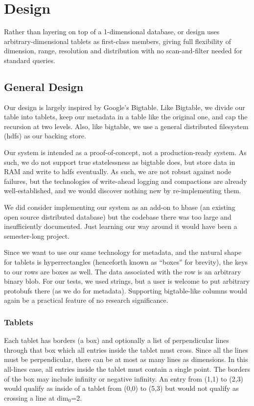 \documentclass[11pt]{article}
\begin{document}
\section{Design}

Rather than layering on top of a 1-dimensional database, or design uses arbitrary-dimensional tablets as first-class members, giving full flexibility of dimension, range, resolution and distribution with no scan-and-filter needed for standard queries.\

\subsection{General Design}

Our design is largely inspired by Google's Bigtable. Like Bigtable, we divide our table into tablets, keep our metadata in a table like the original one, and cap the recursion at two levels. Also, like bigtable, we use a general distributed filesystem (hdfs) as our backing store.

Our system is intended as a proof-of-concept, not a production-ready system. As such, we do not support true statelessness as bigtable does, but store data in RAM and write to hdfs eventually. As such, we are not robust against node failures, but the technologies of write-ahead logging and compactions are already well-established, and we would discover nothing new by re-implementing them.

We did consider implementing our system as an add-on to hbase (an existing open source distributed database) but the codebase there was too large and insufficiently documented. Just learning our way around it would have been a semester-long project.

Since we want to use our same technology for metadata, and the natural shape for tablets is hyperrectangles (henceforth known as ``boxes'' for brevity), the keys to our rows are boxes as well. The data associated with the row is an arbitrary binary blob. For our tests, we used strings, but a user is welcome to put arbitrary protobufs there (as we do for metadata). Supporting bigtable-like columns would again be a practical feature of no research significance.

\subsubsection{Tablets}

Each tablet has borders (a box) and optionally a list of perpendicular lines through that box which all entries inside the tablet must cross. Since all the lines must be perpendicular, there can be at most as many lines as dimensions. In this all-lines case, all entries inside the tablet must contain a single point. The borders of the box may include infinity or negative infinity. An entry from (1,1) to (2,3) would qualify as inside of a tablet from (0,0) to (5,3) but would not qualify as crossing a line at dim$_0$=2.
\end{document}
